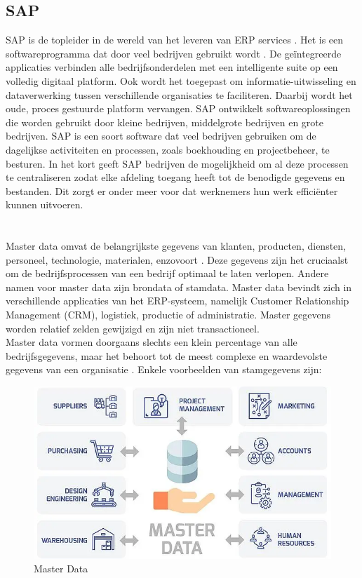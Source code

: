 \subsection{SAP}
SAP is de topleider in de wereld van het leveren van ERP services \autocite{WatSAP}. Het is een softwareprogramma dat door veel bedrijven gebruikt wordt \autocite{Indeed2023}. De geïntegreerde applicaties verbinden alle bedrijfsonderdelen met een intelligente suite op een volledig digitaal platform. Ook wordt het toegepast om informatie-uitwisseling en dataverwerking tussen verschillende organisaties te faciliteren. Daarbij wordt het oude, proces gestuurde platform vervangen. SAP ontwikkelt softwareoplossingen die worden gebruikt door kleine bedrijven, middelgrote bedrijven en grote bedrijven.
SAP is een soort software dat veel bedrijven gebruiken om de dagelijkse activiteiten en processen, zoals boekhouding en projectbeheer, te besturen. In het kort geeft SAP bedrijven de mogelijkheid om al deze processen te centraliseren zodat elke afdeling toegang heeft tot de benodigde gegevens en bestanden. Dit zorgt er onder meer voor dat werknemers hun werk efficiënter kunnen uitvoeren.

\section{}%
\label{sec:masterdata}
Master data omvat de belangrijkste gegevens van klanten, producten, diensten, personeel, technologie, materialen, enzovoort \autocite{Prokhorov2018}. Deze gegevens zijn het cruciaalst om de bedrijfsprocessen van een bedrijf optimaal te laten verlopen. Andere namen voor master data zijn brondata of stamdata. Master data bevindt zich in verschillende applicaties van het ERP-systeem, namelijk Customer Relationship Management (CRM), logistiek, productie of administratie. Master gegevens worden relatief zelden gewijzigd en zijn niet transactioneel.
\\ Master data vormen doorgaans slechts een klein percentage van alle bedrijfsgegevens, maar het behoort tot de meest complexe en waardevolste gegevens van een organisatie \autocite{SAPMasterData}. 
Enkele voorbeelden van stamgegevens zijn: 

\begin{figure}[htbp]
  \centering
  \includegraphics[scale=0.4]{../images/Master-Data.png}
  \caption{Master Data}
\end{figure}


